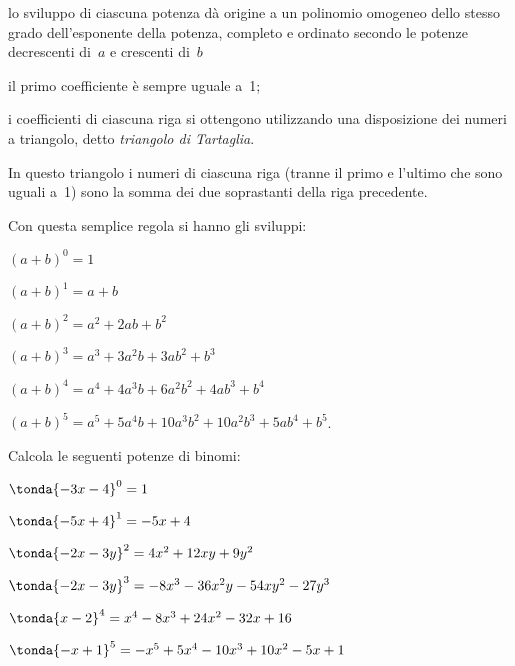 \begin{itemize*}
\item lo sviluppo di ciascuna potenza dà origine a un polinomio
omogeneo dello stesso grado dell'esponente della
potenza, completo e ordinato secondo le potenze decrescenti di~\(a\) e 
crescenti di~\(b\)
\item il primo coefficiente è sempre uguale a~1;
\item i coefficienti di ciascuna riga si ottengono utilizzando una
disposizione dei numeri a triangolo, detto \emph{triangolo di Tartaglia}.
\end{itemize*}

\begin{inaccessibleblock}
\begin{minipage}[t]{.49\textwidth}
 \centering 
\end{minipage}
\hfil
 \begin{minipage}[t]{.49\textwidth}
 \centering 
\end{minipage}
\end{inaccessibleblock}

In questo triangolo i numeri di ciascuna riga (tranne il primo e
l'ultimo che sono uguali a~1) sono la somma dei due
soprastanti della riga precedente.

Con questa semplice regola si hanno gli sviluppi:

\begin{itemize*}
\item \((a+b)^{0}=1\)
\item \((a+b)^{1}=a+b\)
\item \((a+b)^{2}=a^{2}+2{ab}+b^{2}\)
\item \((a+b)^{3}=a^{3}+3a^{2}b+3{ab}^{2}+b^{3}\)
\item \((a+b)^{4}=a^{4}+4a^{3}b+6a^{2}b^{2}+4{ab}^{3}+b^{4}\)
\item \((a+b)^{5}=a^{5}+5a^{4}b+10a^{3}b^{2}+10a^{2}b^{3}+5{ab}^{4}+b^{5}\).
\end{itemize*}

\begin{esempio} Calcola le seguenti potenze di binomi:
\begin{enumeratea}
\item \(\tonda{-3x-4}^0  = 1\)
\item \(\tonda{-5x+4}^1  = -5x+4\)
\item \(\tonda{-2x-3y}^2 = 4x^2+12xy+9y^2\)
\item \(\tonda{-2x-3y}^3 = -8x^3-36x^2y-54xy^2-27y^3\)
\item \(\tonda{x-2}^4    = x^4 -8x^3+24x^2-32x+16\)
\item \(\tonda{-x+1}^5   = -x^5 +5x^4-10x^3+10x^2-5x+1\)
\end{enumeratea}
\end{esempio}



